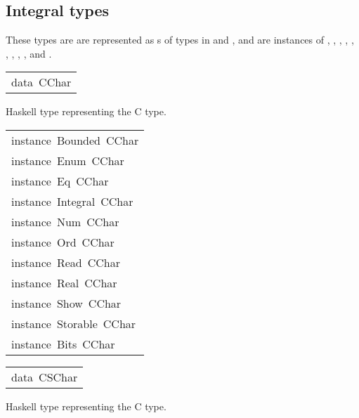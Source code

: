 \subsection{Integral types
}
These types are are represented as s of
 types in  and , and are instances of
 , , , ,
 , , ,
 , ,  and
 .
\par

\begin{haddockdesc}
\item[\begin{tabular}{@{}l}
data\ CChar
\end{tabular}]\haddockbegindoc
Haskell type representing the C  type.
\par

\end{haddockdesc}
\begin{haddockdesc}
\item[\begin{tabular}{@{}l}
instance\ Bounded\ CChar\\instance\ Enum\ CChar\\instance\ Eq\ CChar\\instance\ Integral\ CChar\\instance\ Num\ CChar\\instance\ Ord\ CChar\\instance\ Read\ CChar\\instance\ Real\ CChar\\instance\ Show\ CChar\\instance\ Storable\ CChar\\instance\ Bits\ CChar
\end{tabular}]
\end{haddockdesc}
\begin{haddockdesc}
\item[\begin{tabular}{@{}l}
data\ CSChar
\end{tabular}]\haddockbegindoc
Haskell type representing the C  type.
\par

\end{haddockdesc}
